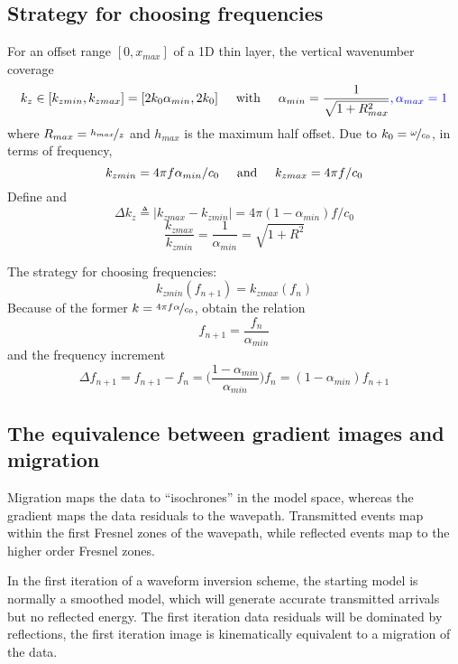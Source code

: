 \subsection{Strategy for choosing frequencies}
For an offset range $[0,x_{max}]$ of a 1D thin layer, the vertical wavenumber coverage
\[ k_z\in[k_{zmin},k_{zmax}]=[2k_0\alpha_{min},2k_0] \text{\hspace{5mm}with\hspace{5mm}} \alpha_{min}=\frac{1}{\sqrt{1+R_{max}^2}}{\color{blue},\alpha_{max}=1} \]
where $R_{max}=\nicefrac{h_{max}}{z}$ and $h_{max}$ is the maximum half offset.
Due to $k_0=\nicefrac{\omega}{c_0}$, in terms of frequency,
\[ k_{zmin}=4\pi f\alpha_{min}/c_0 \text{\hspace{5mm}and\hspace{5mm}} k_{zmax}=4\pi f/c_0 \]
Define  and 
\[ \Delta k_z\triangleq|k_{zmax}-k_{zmin}|=4\pi(1-\alpha_{min})f/c_0 \]
\[ \frac{k_{zmax}}{k_{zmin}}=\frac{1}{\alpha_{min}}=\sqrt{1+R^2} \]

The strategy for choosing frequencies:
\[ k_{zmin}(f_{n+1})=k_{zmax}(f_n) \]
Because of the former $k=\nicefrac{4\pi f\alpha}{c_0}$, obtain the relation
\[ f_{n+1}=\frac{f_n}{\alpha_{min}} \]
and the frequency increment
\[ \Delta f_{n+1}=f_{n+1}-f_n=\Big(\frac{1-\alpha_{min}}{\alpha_{min}}\Big)f_n=(1-\alpha_{min})f_{n+1} \]

\subsection{The equivalence between gradient images and migration}
Migration maps the data to ``isochrones'' in the model space,
whereas the gradient maps the data residuals to the wavepath.
Transmitted events map within the first Fresnel zones of the wavepath,
while reflected events map to the higher order Fresnel zones.

In the first iteration of a waveform inversion scheme,
the starting model is normally a smoothed model,
which will generate accurate transmitted arrivals but no reflected energy.
The first iteration data residuals will be dominated by reflections,
the first iteration image is kinematically equivalent to a migration of the data.

